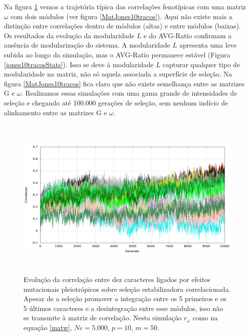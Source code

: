Na figura \ref{jones10tracos} vemos a trajetória típica das correlações
fenotípicas com uma matriz $\omega$ com dois módulos (ver figura
\ref{MatJones10tracos}).  
Aqui não existe mais a distinção entre
correlações dentro de módulos (altas) e entre módulos (baixas). 
Os resultados da evolução da modularidade $L$ e do AVG-Ratio confirmam a
ausência de modularização do sistema. 
A modularidade $L$ apresenta uma leve subida ao longo da simulação, mas
o AVG-Ratio permanece estável (Figura \ref{jones10tracosStats}). 
Isso se deve à modularidade $L$ capturar qualquer tipo de modularidade
na matriz, não só aquela associada a superfície de seleção. 
Na figura \ref{MatJones10tracos} fica claro que não existe semelhança
entre as matrizes G e $\omega$. 
Realizamos essas simulações com uma gama grande de intensidades de
seleção e chegando até 100.000 gerações de seleção, sem nenhum indício de
alinhamento entre as matrizes G e $\omega$.  


\begin{figure}[htbp]
  \centering
  \includegraphics[width=150mm, height=80mm]{figuras/jones10tracos.png}
  \caption{Evolução da correlação entre dez caracteres ligados por efeitos
  mutacionais pleiotrópicos sobre seleção estabilizadora
  correlacionada. Apesar de a seleção promover a integração entre os
  5 primeiros e os 5 últimos caracteres e a desintegração entre esse
  módulos, isso não se transmite à matriz de correlação. Nesta simulação
  $r_\omega$ como na equação \ref{matw}, $Ne=5.000$, $p=10$, $m=50$.}
  \label{jones10tracos}
\end{figure}



